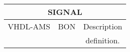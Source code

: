 \begin{center}
\begin{tabular}{ c  c  c }
\multicolumn{3}{c}{\textbf{SIGNAL}}\\ 
\hline \hline
VHDL-AMS & BON & Description \\ 
\hline \hline

\begin{minipage}[c]{2.4cm} 
\centering
\smallskip \smallskip 

\smallskip \smallskip
\end{minipage}  
&
\begin{minipage}[c]{4.6cm}
\centering 
\smallskip \smallskip

\smallskip \smallskip
\end{minipage}  
& 
\begin{minipage}[c]{6cm}  
\smallskip \smallskip
definition.
\smallskip \smallskip
\end{minipage}\\ 
\end{tabular}
\end{center}
